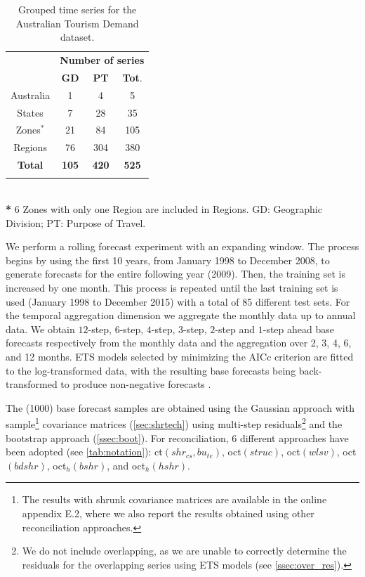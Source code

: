 \documentclass[a4paper,11pt]{article}
\theoremstyle{definition}
\begin{document}
\begin{table}[b]
	\setlength{\tabcolsep}{10pt}
	\centering
	\begin{tabular}{c|cc|c}
		\toprule
		& \multicolumn{3}{c}{\textbf{Number of series}}\\
		& \textbf{GD} & \textbf{PT} & \textbf{Tot}. \\
		\midrule
		Australia & 1 & 4 & 5 \\
		States & 7 & 28 & 35 \\
		Zones$^*$ & 21 & 84 & 105 \\
		Regions & 76 & 304 & 380 \\
		\bottomrule
		\textbf{Total} & \textbf{105}                                  & \textbf{420}   & \textbf{525} \\
		\bottomrule
		\addlinespace[0.3em]
	\end{tabular}\\
	{\footnotesize \textbf{*} 6 Zones with only one Region are included in Regions. GD: Geographic Division; PT: Purpose of Travel.}\\[0.1cm]
	\caption{\label{tab:nseries} Grouped time series for the Australian Tourism Demand dataset. }
	\vspace*{-0.5\baselineskip}
\end{table}

We perform a rolling forecast experiment with an expanding window. The process begins by using the first 10 years, from January 1998 to December 2008, to generate forecasts for the entire following year (2009). Then, the training set is increased by one month. This process is repeated until the last training set is used (January 1998 to December 2015) with a total of 85 different test sets. For the temporal aggregation dimension we aggregate the monthly data up to annual data. We obtain $12$-step, $6$-step, $4$-step, $3$-step, $2$-step and $1$-step ahead base forecasts respectively from the monthly data and the aggregation over 2, 3, 4, 6, and 12 months. ETS models selected by minimizing the AICc criterion \citep{Rforecast} %
are fitted to the log-transformed data, with the resulting base forecasts being back-transformed to produce non-negative forecasts \citep{wickramasuriya2020}.

The (1000) base forecast samples are obtained using the Gaussian approach with sample\footnote{The results with shrunk covariance matrices are available in the online appendix E.2, where we also report the results obtained using other reconciliation approaches.} covariance matrices (\autoref{sec:shrtech}) using multi-step residuals\footnote{We do not include overlapping, as we are unable to correctly determine the residuals for the overlapping series using ETS models (see \autoref{ssec:over_res}).} and the bootstrap approach (\autoref{ssec:boot}). For reconciliation, 6 different approaches have been adopted (see \autoref{tab:notation}): ct$(shr_{cs}, bu_{te})$, oct$(struc)$, oct$(wlsv)$, oct$(bdshr)$, oct$_h(bshr)$, and oct$_h(hshr)$.
\end{document}
